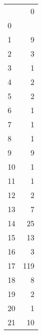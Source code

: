 \begin{tabular}{lr}
\toprule
   &    0 \\
0 &      \\
\midrule
1  &    9 \\
2  &    3 \\
3  &    1 \\
4  &    2 \\
5  &    2 \\
6  &    1 \\
7  &    1 \\
8  &    1 \\
9  &    9 \\
10 &    1 \\
11 &    1 \\
12 &    2 \\
13 &    7 \\
14 &   25 \\
15 &   13 \\
16 &    3 \\
17 &  119 \\
18 &    8 \\
19 &    2 \\
20 &    1 \\
21 &   10 \\
\bottomrule
\end{tabular}
